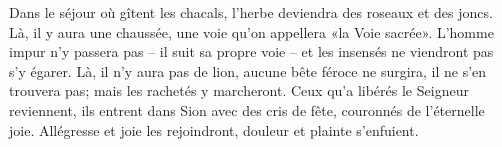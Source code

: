 Dans le séjour où gîtent les chacals,
	l’herbe deviendra des roseaux et des joncs.
Là, il y aura une chaussée,
	une voie qu’on appellera «la Voie sacrée».
L’homme impur n’y passera pas – il suit sa propre voie –
	et les insensés ne viendront pas s’y égarer.
Là, il n’y aura pas de lion,
	aucune bête féroce ne surgira, il ne s’en trouvera pas;
	mais les rachetés y marcheront.
Ceux qu’a libérés le Seigneur reviennent,
	ils entrent dans Sion avec des cris de fête,
	couronnés de l’éternelle joie.
Allégresse et joie les rejoindront,
	douleur et plainte s’enfuient.
